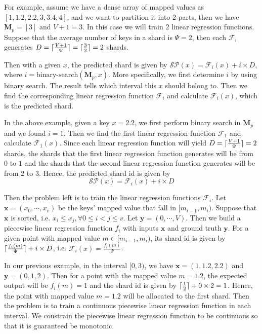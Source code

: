 For example, assume we have a dense array of mapped values as $[1,1.2,2.2,3,3.4,4]$, and we want to partition it into 2 parts, then we have $\boldsymbol{M}_p=[3]$ and $V+1=3$. In this case we will train $2$ linear regression functions. Suppose that the average number of keys in a shard is $\Psi=2$, then each $\mathcal{F}_i$ generates $D=\lceil\frac{V+1}{\Psi}\rceil=\lceil\frac{3}{2}\rceil=2$ shards.

Then with a given $x$, the predicted shard is given by $\mathcal{SP}(x)=\mathcal{F}_i(x)+i\times D$, where $i=\text{binary-search}(\boldsymbol{M}_p,x)$. More specifically, we first determine $i$ by using binary search. The result tells which interval this $x$ should belong to. Then we find the corresponding linear regression function $\mathcal{F}_i$ and calculate $\mathcal{F}_i(x)$, which is the predicted shard.

In the above example, given a key $x=2.2$, we first perform binary search in $\boldsymbol{M}_p$ and we found $i=1$. Then we find the first linear regression function $\mathcal{F}_1$ and calculate $\mathcal{F}_1(x)$. Since each linear regression function will yield $D=\lceil\frac{V+1}{\Psi}\rceil=2$ shards, the shards that the first linear regression function generates will be from $0$ to $1$ and the shards that the second linear regression function generates will be from $2$ to $3$. Hence, the predicted shard id is given by 
$$
\mathcal{SP}(x)=\mathcal{F}_i(x)+i\times D
$$

Then the problem left is to train the linear regression functions $\mathcal{F}_i$. Let $\boldsymbol{x}=(x_0,\cdots,x_v)$ be the keys' mapped value that fall in $[m_{i-1}, m_i)$. Suppose that $\boldsymbol{x}$ is sorted, i.e. $x_i\leq x_j, \forall 0\leq i<j\leq v$. Let $\boldsymbol{y}=(0,\cdots, V)$. Then we build a piecewise linear regression function $f_i$ with inputs $\boldsymbol{x}$ and ground truth $\boldsymbol{y}$. For a given point with mapped value $m\in[m_{i-1}, m_i)$, its shard id is given by $\lceil\frac{f_i(m)}{\Psi}\rceil+i\times D$, i.e. $\mathcal{F}_i(x)=\frac{f_i(m)}{\Psi}$.

In our previous example, in the interval $[0,3)$, we have $\boldsymbol{x}=(1,1.2,2.2)$ and $\boldsymbol{y}=(0,1,2)$. Then for a point with the mapped value $m=1.2$, the expected output will be $f_i(m)=1$ and the shard id is given by $\lceil\frac{1}{2}\rceil+0\times 2=1$. Hence, the point with mapped value $m=1.2$ will be allocated to the first shard. Then the problem is to train a continuous piecewise linear regression function in each interval. We constrain the piecewise linear regression function to be continuous so that it is guaranteed be monotonic.

